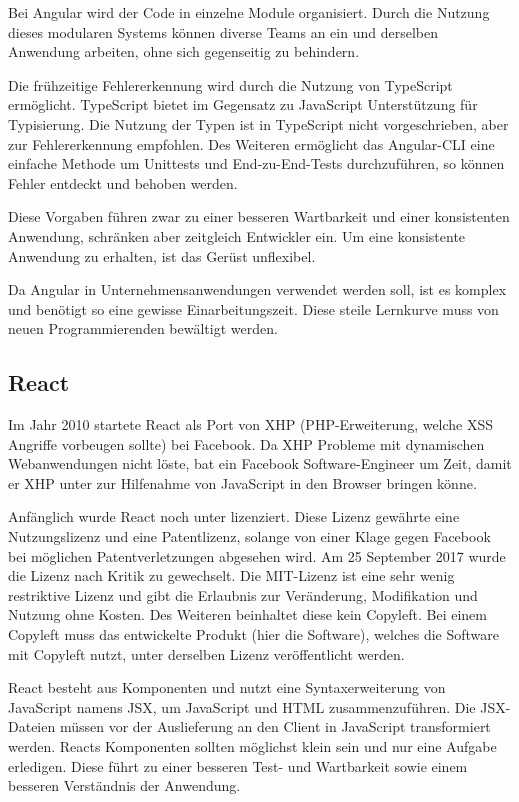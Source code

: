 Bei Angular wird der Code in einzelne Module organisiert. Durch die Nutzung dieses modularen Systems können diverse Teams an ein und derselben Anwendung arbeiten, ohne sich gegenseitig zu behindern.

Die frühzeitige Fehlererkennung wird durch die Nutzung von TypeScript ermöglicht. TypeScript bietet im Gegensatz zu JavaScript Unterstützung für Typisierung. Die Nutzung der Typen ist in TypeScript nicht vorgeschrieben, aber zur Fehlererkennung empfohlen.
Des Weiteren ermöglicht das Angular-CLI eine einfache Methode um Unittests und End-zu-End-Tests durchzuführen, so können Fehler entdeckt und behoben werden. \cite{wahlinWesentlichenVorteileAngular2017}

Diese Vorgaben führen zwar zu einer besseren Wartbarkeit und einer konsistenten Anwendung, schränken aber zeitgleich Entwickler ein. Um eine konsistente Anwendung zu erhalten, ist das Gerüst unflexibel.

Da Angular in Unternehmensanwendungen verwendet werden soll, ist es komplex und benötigt so eine gewisse Einarbeitungszeit. Diese steile Lernkurve muss von neuen Programmierenden bewältigt werden. \cite{ventzkemediaAngularVsReact2018}

\subsection{React}
Im Jahr 2010 startete React als Port von XHP (PHP-Erweiterung, welche XSS Angriffe vorbeugen sollte) bei Facebook. Da XHP Probleme mit dynamischen Webanwendungen nicht löste, bat ein Facebook Software-Engineer um Zeit, damit er XHP unter zur Hilfenahme von JavaScript in den Browser bringen könne. \cite{dawsonJavaScriptHistoryHow2014}

Anfänglich wurde React noch unter  lizenziert. Diese Lizenz gewährte eine Nutzungslizenz und eine Patentlizenz, solange von einer Klage gegen Facebook bei möglichen Patentverletzungen abgesehen wird. Am 25 September 2017 wurde die Lizenz nach Kritik zu  gewechselt. \cite{kripalaniIfYouRe2017} \cite{larsonFacebookJustChanged2017} Die MIT-Lizenz ist eine sehr wenig restriktive Lizenz und gibt die Erlaubnis zur Veränderung, Modifikation und Nutzung ohne Kosten. Des Weiteren beinhaltet diese kein Copyleft. Bei einem Copyleft muss das entwickelte Produkt (hier die Software), welches die Software mit Copyleft nutzt, unter derselben Lizenz veröffentlicht werden. \cite{wehnerSoftwareUnterMIT2020}

React besteht aus Komponenten und nutzt eine Syntaxerweiterung von JavaScript namens JSX, um JavaScript und HTML zusammenzuführen. Die JSX-Dateien müssen vor der Auslieferung  an den Client in JavaScript transformiert werden. Reacts Komponenten sollten möglichst klein sein und nur eine Aufgabe erledigen. Diese führt zu einer besseren Test- und Wartbarkeit sowie einem besseren Verständnis der Anwendung.

